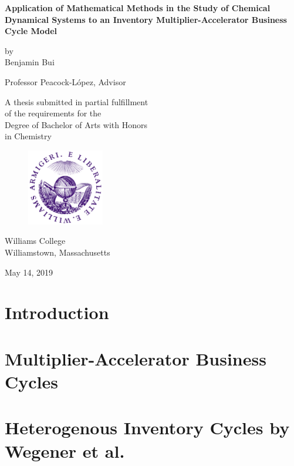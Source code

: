 \documentclass[12pt,twoside]{report}
\begin{document}
\begin{titlepage}
	\begin{center}
		\vspace*{1.5 cm}
		\textbf{Application of Mathematical Methods in the Study of Chemical Dynamical Systems to an Inventory Multiplier-Accelerator Business Cycle Model}


		\vspace{1.5 cm}

		by\\ Benjamin Bui
		\vspace{1.5 cm}

		Professor Peacock-L\'opez, Advisor
		\vspace{1.5 cm}

		A thesis submitted in partial fulfillment\\
		of the requirements for the\\
		Degree of Bachelor of Arts with Honors\\
		in Chemistry
		\begin{figure}[H]
			\centering
			\includegraphics[width=0.3\textwidth]{Williams_College_Seal.png}
		\end{figure}
		Williams College\\
		Williamstown, Massachusetts
		\vspace{1.5 cm}

		May 14, 2019
	\end{center}
\end{titlepage}




\tableofcontents
\thispagestyle{plain}
\chapter{Introduction}

\chapter{Multiplier-Accelerator Business Cycles}\label{ch:multiplier-accelerator}

\chapter{Heterogenous Inventory Cycles by Wegener et al.}\label{ch:metzlerian_simple}

\end{document}
